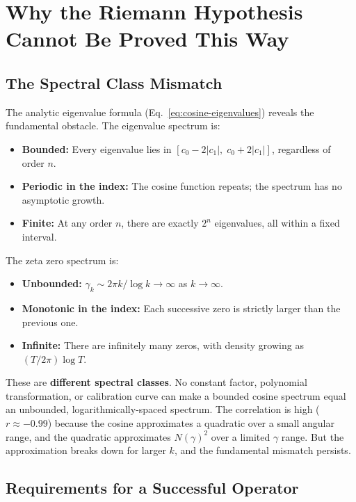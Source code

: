 \documentclass[11pt,a4paper]{article}
\begin{document}
\section{Why the Riemann Hypothesis Cannot Be Proved This Way}

\subsection{The Spectral Class Mismatch}

The analytic eigenvalue formula (Eq.~\ref{eq:cosine-eigenvalues}) reveals
the fundamental obstacle. The eigenvalue spectrum is:

\begin{itemize}
\item \textbf{Bounded:} Every eigenvalue lies in
   $[c_0 - 2|c_1|,\; c_0 + 2|c_1|]$, regardless of order $n$.
\item \textbf{Periodic in the index:} The cosine function repeats; the
   spectrum has no asymptotic growth.
\item \textbf{Finite:} At any order $n$, there are exactly $2^n$
   eigenvalues, all within a fixed interval.
\end{itemize}

The zeta zero spectrum is:

\begin{itemize}
\item \textbf{Unbounded:} $\gamma_k \sim 2\pi k / \log k \to \infty$ as
   $k \to \infty$.
\item \textbf{Monotonic in the index:} Each successive zero is strictly
   larger than the previous one.
\item \textbf{Infinite:} There are infinitely many zeros, with density
   growing as $(T/2\pi)\log T$.
\end{itemize}

These are \textbf{different spectral classes}. No constant factor,
polynomial transformation, or calibration curve can make a bounded cosine
spectrum equal an unbounded, logarithmically-spaced spectrum. The
correlation is high ($r \approx -0.99$) because the cosine approximates a
quadratic over a small angular range, and the quadratic approximates
$N(\gamma)^2$ over a limited $\gamma$ range. But the approximation breaks
down for larger $k$, and the fundamental mismatch persists.

\subsection{Requirements for a Successful Operator}
\end{document}
